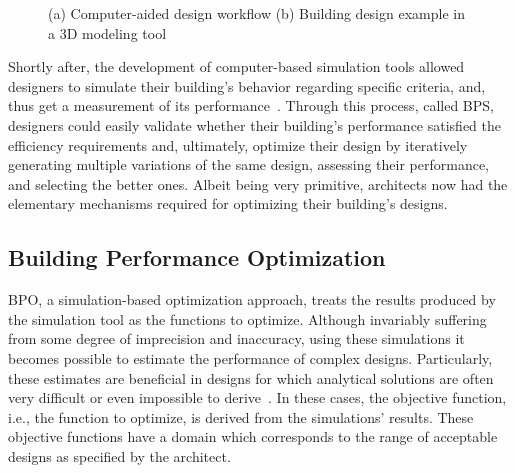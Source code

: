 \begin{figure}[htbp]
\centering
{}%
\hfill
{}%

\caption[General views of Traditional Design Approaches]{(a) Computer-aided design workflow (b) Building design example in a 3D modeling tool}
\label{fig:traditionaldesign}
\end{figure}

	Shortly after, the development of computer-based simulation tools allowed designers to simulate their building's behavior regarding specific criteria, and, thus get a measurement of its performance~\cite{Malkawi2005}. Through this process, called \ac{BPS}, designers could easily validate whether their building's performance satisfied the efficiency requirements and, ultimately, optimize their design by iteratively generating multiple variations of the same design, assessing their performance, and selecting the better ones. Albeit being very primitive, architects now had the elementary mechanisms required for optimizing their building's designs.

\subsection{Building Performance Optimization}

	\ac{BPO}, a simulation-based optimization approach, treats the results produced by the simulation tool as the functions to optimize. Although invariably suffering from some degree of imprecision and inaccuracy, using these simulations it becomes possible to estimate the performance of complex designs. Particularly, these estimates are beneficial in designs for which analytical solutions are often very difficult or even impossible to derive~\cite{Kolda2003}. In these cases, the objective function, i.e., the function to optimize, is derived from the simulations' results. These objective functions have a domain which corresponds to the range of acceptable designs as specified by the architect.

